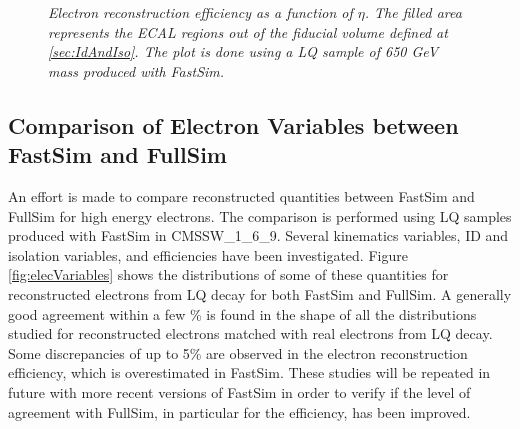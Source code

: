 \begin{figure}
  \begin{center}
    \caption{\small \sl Electron reconstruction efficiency as a function of $\eta$. The filled area represents the  
      ECAL regions out of the fiducial volume defined at \ref{sec:IdAndIso}. The plot is done using a 
      LQ sample of 650 GeV mass produced with FastSim.}
    \label{fig:elecEffFV}
  \end{center}
\end{figure}


\subsection{Comparison of Electron Variables between FastSim and FullSim} \label{sec:elecFastSimCompare}
An effort is made to compare reconstructed quantities between FastSim and FullSim for high energy electrons.
The comparison is performed using LQ samples produced with FastSim in CMSSW\_1\_6\_9. 
Several kinematics variables, ID and isolation variables, and efficiencies have been investigated. 
Figure \ref{fig:elecVariables} shows the distributions of some of these quantities for reconstructed electrons from LQ decay 
for both FastSim and FullSim.
A generally good agreement within a few \% is found in the shape of all the distributions studied for reconstructed electrons matched 
with real electrons from LQ decay. Some discrepancies of up to 5\% are observed in the electron 
reconstruction efficiency,  which is overestimated in FastSim. 
These studies will be repeated in future with more recent versions of FastSim in order to verify if the level 
of agreement with FullSim, in particular for the efficiency, has been improved. 

